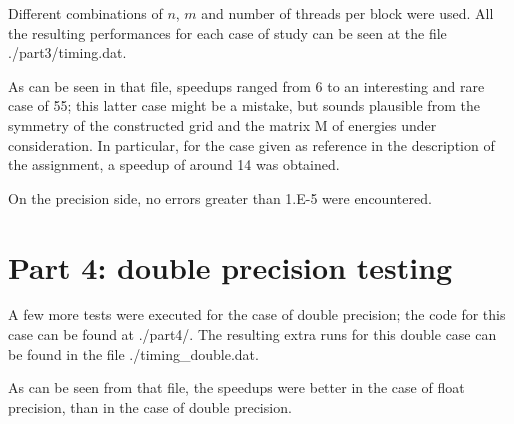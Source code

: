 \documentclass[paper=a4, fontsize=11pt]{scrartcl} %
\numberwithin{equation}{section} %
\numberwithin{figure}{section} %
\numberwithin{table}{section} %
\begin{document}
Different combinations of $n$, $m$ and number of threads per block were used. All the resulting performances for each case of study can be seen at the file ./part3/timing.dat.

As can be seen in that file, speedups ranged from 6 to an interesting and rare case of 55; this latter case might be a mistake, but sounds plausible from the symmetry of the constructed grid and the matrix M of energies under consideration. In particular, for the case given as reference in the description of the assignment, a speedup of around 14 was obtained.

On the precision side, no errors greater than 1.E-5 were encountered.




\section{Part 4: double precision testing}


A few more tests were executed for the case of double precision; the code for this case can be found at ./part4/. The resulting extra runs for this double case can be found in the file ./timing\_double.dat.

As can be seen from that file, the speedups were better in the case of float precision, than in the case of double precision.
\end{document}
